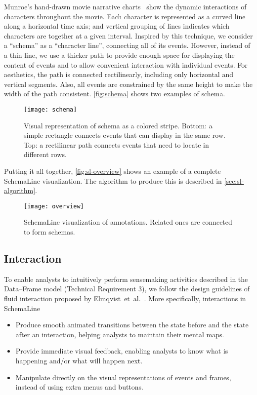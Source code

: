Munroe's hand-drawn movie narrative charts~\cite{Munroe2009} show the dynamic interactions of characters throughout the movie. Each character is represented as a curved line along a horizontal time axis; and vertical grouping of lines indicates which characters are together at a given interval. Inspired by this technique, we consider a ``schema'' as a ``character line'', connecting all of its events. However, instead of a thin line, we use a thicker path to provide enough space for displaying the content of events and to allow convenient interaction with individual events. For aesthetics, the path is connected rectilinearly, including only horizontal and vertical segments. Also,  all events are constrained by the same height to make the width of the path consistent. \autoref{fig:schema} shows two examples of schema. 

\begin{figure}[!htb]
	\centering
	\texttt{[image: schema]}
	\caption{Visual representation of schema as a colored stripe. Bottom: a simple rectangle connects events that can display in the same row. Top: a rectilinear path connects events that need to locate in different rows.}
	\label{fig:schema}
\end{figure}

Putting it all together, \autoref{fig:sl-overview} shows an example of a complete SchemaLine visualization. The algorithm to produce this is described in \autoref{sec:sl-algorithm}.

\begin{figure}[!htb]
	\centering
	\texttt{[image: overview]}
	\caption{SchemaLine visualization of annotations. Related ones are connected to form schemas.}
	\label{fig:sl-overview}
\end{figure}

\subsection{Interaction}
To enable analysts to intuitively perform sensemaking activities described in the Data--Frame model (Technical Requirement 3), we follow the design guidelines of fluid interaction proposed by Elmqvist~et~al.~\cite{Elmqvist2011}. More specifically, interactions in SchemaLine 
\begin{itemize}
	\item Produce smooth animated transitions between the state before and the state after an interaction, helping analysts to maintain their mental maps.
	\item Provide immediate visual feedback, enabling analysts to know what is happening and/or what will happen next.
	\item Manipulate directly on the visual representations of events and frames, instead of using extra menus and buttons.
\end{itemize}

